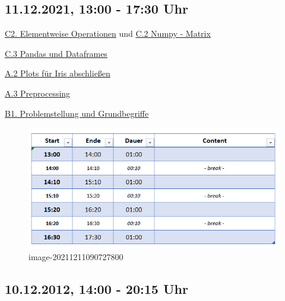 \documentclass[
]{book}
\theoremstyle{definition}
\theoremstyle{definition}
\theoremstyle{definition}
\theoremstyle{definition}
\theoremstyle{remark}
\begin{document}
\hypertarget{uhr-2}{%
\subsection*{11.12.2021, 13:00 - 17:30 Uhr}\label{uhr-2}}

\href{https://the-technology-lab.gitbook.io/dsml-master-duf/S0aldZCOg4S1HudPOP87/py/numpy\#elementweise-operationen}{C2. Elementweise Operationen} und \href{https://the-technology-lab.gitbook.io/dsml-master-duf/S0aldZCOg4S1HudPOP87/py/numpy\#matrix}{C.2 Numpy - Matrix}

\href{https://the-technology-lab.gitbook.io/dsml-master-duf/S0aldZCOg4S1HudPOP87/py/pandas-und-dataframes}{C.3 Pandas und Dataframes}

\href{https://the-technology-lab.gitbook.io/dsml-master-duf/S0aldZCOg4S1HudPOP87/da/0a4_visualisierung\#plots-fuer-iris}{A.2 Plots für Iris abschließen}

\href{https://the-technology-lab.gitbook.io/dsml-master-duf/S0aldZCOg4S1HudPOP87/da/0a3_preprocessing/4-datentransformation}{A.3 Preprocessing}

\href{https://the-technology-lab.gitbook.io/dsml-master-duf/S0aldZCOg4S1HudPOP87/ml/0c_ml_grundbegriffe}{B1. Problemstellung und Grundbegriffe}

\begin{figure}
\centering
\includegraphics{assets/README.assets/image-20211211090727800.png}
\caption{image-20211211090727800}
\end{figure}

\hypertarget{uhr-3}{%
\subsection*{10.12.2012, 14:00 - 20:15 Uhr}\label{uhr-3}}
\end{document}
